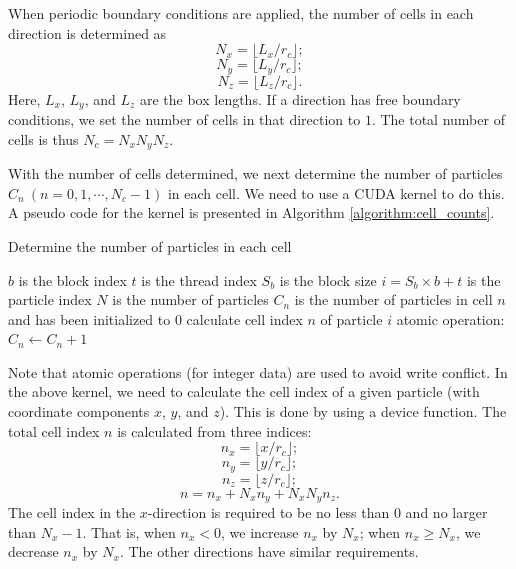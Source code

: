 \documentclass[12pt,a4paper]{report}
\begin{document}
When periodic boundary conditions are applied, the number of cells in each direction is determined as
\begin{equation}
N_{x} = \lfloor L_x / r_c \rfloor;
\end{equation}
\begin{equation}
N_{y} = \lfloor L_y / r_c \rfloor;
\end{equation}
\begin{equation}
N_{z} = \lfloor L_z / r_c \rfloor.
\end{equation}
Here, $L_x$, $L_y$, and $L_z$ are the box lengths.
If a direction has free boundary conditions, we set the number of cells in that direction to $1$. The total number of cells is thus $N_c = N_x N_y N_z$.

With the number of cells determined, we next determine the number of particles $C_n ~(n=0, 1, \cdots, N_c-1)$ in each cell. We need to use a CUDA kernel to do this. A pseudo code for the kernel is presented in Algorithm  \ref{algorithm:cell_counts}.


\begin{algorithm}[htbp]
\caption{Determine the number of particles in each cell}
\label{algorithm:cell_counts}
\begin{algorithmic}[1]
\Require $b$ is the block index
\Require $t$ is the thread index
\Require $S_b$ is the block size
\Require $i=S_b\times b+t$ is the particle index
\Require $N$ is the number of particles
\Require $C_n$ is the number of particles in cell $n$ and has been initialized to 0
	\State calculate cell index $n$ of particle $i$
	\State atomic operation: $C_n \leftarrow C_n +1$
\EndIf
 \end{algorithmic}
\end{algorithm}

Note that atomic operations (for integer data) are used to avoid write conflict. In the above kernel, we need to calculate the cell index of a given particle (with coordinate components $x$, $y$, and $z$). This is done by using a device function. The total cell index $n$ is calculated from three indices:
\begin{equation}
n_x = \lfloor x / r_c \rfloor;
\end{equation}
\begin{equation}
n_y = \lfloor y / r_c \rfloor;
\end{equation}
\begin{equation}
n_z = \lfloor z / r_c \rfloor;
\end{equation}
\begin{equation}
n = n_x + N_x n_y + N_x N_y n_z.
\end{equation}
The cell index in the $x$-direction is required to be no less than 0 and no larger than $N_x-1$. That is, when $n_x < 0$, we increase $n_x$ by $N_x$; when $n_x \geq N_x$, we decrease $n_x$ by $N_x$. The other directions have similar requirements.
\end{document}
